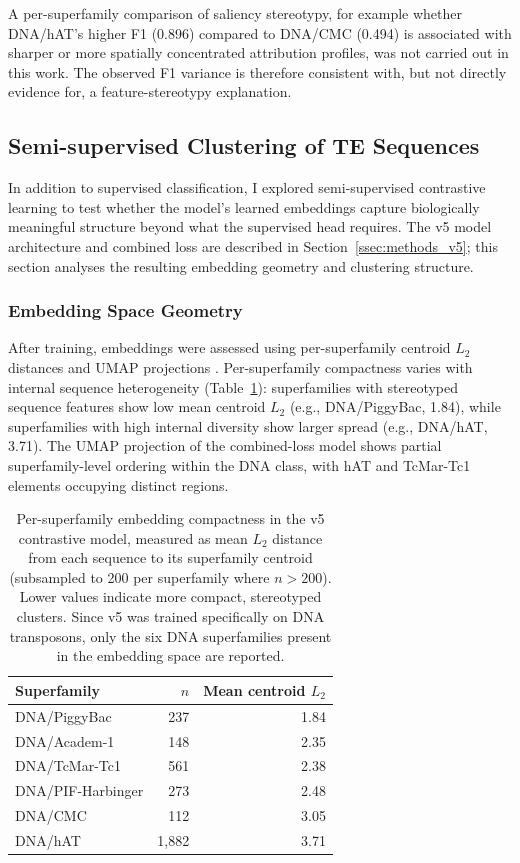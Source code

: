 \documentclass[12pt]{article}
\begin{document}
A per-superfamily comparison of saliency stereotypy, for example whether DNA/hAT's higher F1 (0.896) compared to DNA/CMC (0.494) is associated with sharper or more spatially concentrated attribution profiles, was not carried out in this work. The observed F1 variance is therefore consistent with, but not directly evidence for, a feature-stereotypy explanation.

\subsection{Semi-supervised Clustering of TE Sequences}\label{ssec:clustering}

In addition to supervised classification, I explored semi-supervised contrastive learning to test whether the model's learned embeddings capture biologically meaningful structure beyond what the supervised head requires. The v5 model architecture and combined loss are described in Section~\ref{ssec:methods_v5}; this section analyses the resulting embedding geometry and clustering structure.

\subsubsection{Embedding Space Geometry}

After training, embeddings were assessed using per-superfamily centroid $L_2$ distances and UMAP projections \cite{mcginnis2021umap}. Per-superfamily compactness varies with internal sequence heterogeneity (Table~\ref{tab:l2_compactness}): superfamilies with stereotyped sequence features show low mean centroid $L_2$ (e.g., DNA/PiggyBac, 1.84), while superfamilies with high internal diversity show larger spread (e.g., DNA/hAT, 3.71). The UMAP projection of the combined-loss model shows partial superfamily-level ordering within the DNA class, with hAT and TcMar-Tc1 elements occupying distinct regions.

\begin{table}[h]
\centering
\begin{tabular}{lrr}
\toprule
Superfamily & $n$ & Mean centroid $L_2$ \\
\midrule
DNA/PiggyBac      & 237  & 1.84 \\
DNA/Academ-1      & 148  & 2.35 \\
DNA/TcMar-Tc1     & 561  & 2.38 \\
DNA/PIF-Harbinger & 273  & 2.48 \\
DNA/CMC           & 112  & 3.05 \\
DNA/hAT           & 1{,}882 & 3.71 \\
\bottomrule
\end{tabular}
\caption{Per-superfamily embedding compactness in the v5 contrastive model, measured as mean $L_2$ distance from each sequence to its superfamily centroid (subsampled to 200 per superfamily where $n > 200$). Lower values indicate more compact, stereotyped clusters. Since v5 was trained specifically on DNA transposons, only the six DNA superfamilies present in the embedding space are reported.}
\label{tab:l2_compactness}
\end{table}
\end{document}
